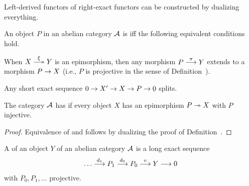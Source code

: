 \documentclass[a4paper,parskip=half,numbers=enddot, DIV=12]{scrreprt}
\begin{document}
Left-derived functors of right-exact functors can be constructed by dualizing everything.
\begin{defi}
	An object $P$ in an abelian category $\mathcal{A}$ is  iff the following equivalent conditions hold.
	\begin{alphanumerate}
		\item When $X\epimorphism[\xi] Y$ is an epimorphism, then any morphism $P\morphism[\pi] Y$ extends to a morphism $P\morphism X$ (i.e., $P$ is projective in the sense of Definition~).
		\item Any short exact sequence $0\morphism X'\morphism X\morphism P\morphism 0$ splits.
	\end{alphanumerate}
	The category $\mathcal{A}$ has  if every object $X$ has an epimorphism $P\epimorphism X$ with $P$ injective.
\end{defi}
\begin{proof}
	Equivalence of  and  follows by dualizing the proof of Definition~.
\end{proof}
\begin{defi}
	A  of an object $Y$ of an abelian category $\mathcal{A}$ is a long exact sequence
	\begin{align*}
		\ldots\morphism[d_1]P_1\morphism[d_0] P_0\morphism[\upsilon] Y\morphism 0
	\end{align*}
	with $P_0,P_1,\ldots$ projective.
\end{defi}
\end{document}
